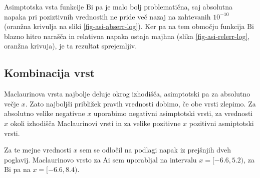 \documentclass[a4paper, 12pt, slovene]{article}
\newcommand{\Ai}{\mathrm{Ai}}
\newcommand{\Bi}{\mathrm{Bi}}
\begin{document}
Asimptotska vsta funkcije $\Bi$ pa je malo bolj problematična, saj absolutna napaka pri poziztivnih vrednostih ne pride več nazaj na zahtevanih $10^{-10}$ (oranžna krivulja na sliki \ref{fig-asi-abserr-log}). Ker pa na tem območju funkcija $\Bi$ blazno hitro narašča in relativna napaka ostaja majhna (slika \ref{fig-asi-relerr-log}, oranžna krivuja), je ta rezultat sprejemljiv.


\subsection{Kombinacija vrst}
Maclaurinova vrsta najbolje deluje okrog izhodišča, asimptotski pa za absolutno večje $x$. Zato najboljši približek pravih vrednosti dobimo, če obe vrsti zlepimo. Za absolutno velike negativne $x$ uporabimo negativni asimptotski vrsti, za vrednosti $x$ okoli izhodišča Maclaurinovi vrsti in za velike pozitivne $x$ pozitivni asmiptotski vrsti.\par\vspace{5mm}

Za te mejne vrednosti $x$ sem se odločil na podlagi napak iz prejšnjih dveh poglavij. Maclaurinovo vrsto za $\Ai$ sem uporabljal na intervalu $x = [-6.6, 5.2)$, za $\Bi$ pa na $x = [-6.6, 8.4)$.
\end{document}
